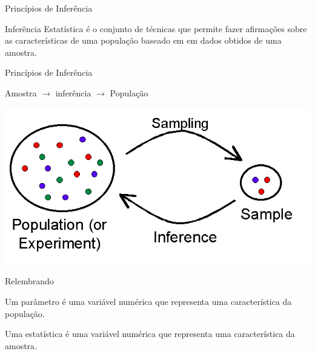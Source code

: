 \documentclass{beamer}
\begin{document}
\begin{frame}{Princípios de Inferência}
  \begin{definition}
\alert{Inferência Estatística} é o conjunto de técnicas que permite
fazer afirmações sobre as características de uma população baseado em
em dados obtidos de uma amostra.
  \end{definition}
\end{frame}

\begin{frame}{Princípios de Inferência}
  \begin{block}{}
    \begin{center}
      Amostra $\rightarrow$ \alert{inferência} $\rightarrow$ População
    \end{center}
  \end{block}
  \begin{center}
    \includegraphics[height=0.4\textheight]{PopulationSample}
  \end{center}
\end{frame}

\begin{frame}{Relembrando}
  \begin{definition}
    Um \alert<1>{parâmetro} é uma variável numérica que representa uma
    característica da \alert<1>{população}.
  \end{definition}
  \begin{definition}
    Uma \alert<2>{estatística} é uma variável numérica que representa
    uma característica da \alert<2>{amostra}.
  \end{definition}
\end{frame}
\end{document}
